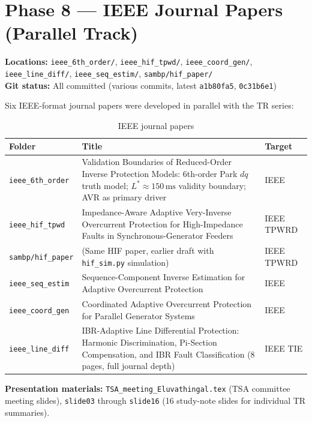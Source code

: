 \documentclass[11pt,a4paper]{article}
\begin{document}
\section{Phase 8 — IEEE Journal Papers (Parallel Track)}

\begin{phasebox}
\textbf{Locations:} \texttt{ieee\_6th\_order/}, \texttt{ieee\_hif\_tpwd/},
\texttt{ieee\_coord\_gen/}, \texttt{ieee\_line\_diff/},
\texttt{ieee\_seq\_estim/}, \texttt{sambp/hif\_paper/}\\
\textbf{Git status:} All committed (various commits, latest
\texttt{a1b80fa5}, \texttt{0c31b6e1})
\end{phasebox}

Six IEEE-format journal papers were developed in parallel with the TR series:

\begin{table}[h!]
\centering
\caption{IEEE journal papers}
\begin{tabularx}{\textwidth}{lXl}
\toprule
\textbf{Folder} & \textbf{Title} & \textbf{Target} \\
\midrule
\texttt{ieee\_6th\_order} & Validation Boundaries of Reduced-Order Inverse Protection Models: 6th-order Park $dq$ truth model; $L^* \approx 150\,\mathrm{ms}$ validity boundary; AVR as primary driver & IEEE \\[4pt]
\texttt{ieee\_hif\_tpwd} & Impedance-Aware Adaptive Very-Inverse Overcurrent Protection for High-Impedance Faults in Synchronous-Generator Feeders & IEEE TPWRD \\[4pt]
\texttt{sambp/hif\_paper} & (Same HIF paper, earlier draft with \texttt{hif\_sim.py} simulation) & IEEE TPWRD \\[4pt]
\texttt{ieee\_seq\_estim} & Sequence-Component Inverse Estimation for Adaptive Overcurrent Protection & IEEE \\[4pt]
\texttt{ieee\_coord\_gen} & Coordinated Adaptive Overcurrent Protection for Parallel Generator Systems & IEEE \\[4pt]
\texttt{ieee\_line\_diff} & IBR-Adaptive Line Differential Protection: Harmonic Discrimination, Pi-Section Compensation, and IBR Fault Classification (8 pages, full journal depth) & IEEE TIE \\[4pt]
\bottomrule
\end{tabularx}
\end{table}

\textbf{Presentation materials:} \texttt{TSA\_meeting\_Eluvathingal.tex} (TSA
committee meeting slides), \texttt{slide03} through \texttt{slide16}
(16 study-note slides for individual TR summaries).
\end{document}
